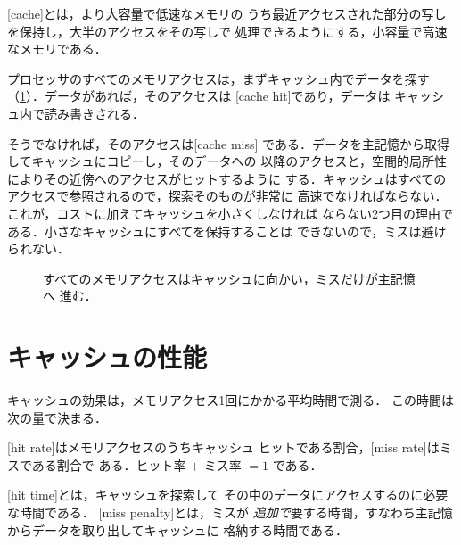 \documentclass[../main.tex]{subfiles}
\begin{document}
\begin{definition}[キャッシュ]
  [cache]とは，より大容量で低速なメモリの
  うち最近アクセスされた部分の写しを保持し，大半のアクセスをその写しで
  処理できるようにする，小容量で高速なメモリである．
\end{definition}

プロセッサのすべてのメモリアクセスは，まずキャッシュ内でデータを探す
（\cref{fig:l12-cache-position}）．データがあれば，そのアクセスは
[cache hit]であり，データは
キャッシュ内で読み書きされる．

そうでなければ，そのアクセスは[cache miss]%
である．データを主記憶から取得してキャッシュにコピーし，そのデータへの
以降のアクセスと，空間的局所性によりその近傍へのアクセスがヒットするように
する．キャッシュはすべてのアクセスで参照されるので，探索そのものが非常に
高速でなければならない．これが，コストに加えてキャッシュを小さくしなければ
ならない2つ目の理由である．小さなキャッシュにすべてを保持することは
できないので，ミスは避けられない．

\begin{figure}[htbp]
  \centering
  
  \caption{すべてのメモリアクセスはキャッシュに向かい，ミスだけが主記憶へ
    進む．}
  \label{fig:l12-cache-position}
\end{figure}

\section{キャッシュの性能}
\label{sec:l12-performance}

キャッシュの効果は，メモリアクセス1回にかかる平均時間で測る．
この時間は次の量で決まる．

\begin{definition}
  [hit rate]はメモリアクセスのうちキャッシュ
  ヒットである割合，[miss rate]はミスである割合で
  ある．ヒット率 $+$ ミス率 $= 1$ である．
\end{definition}

\begin{definition}
  [hit time]とは，キャッシュを探索して
  その中のデータにアクセスするのに必要な時間である．
  [miss penalty]とは，ミスが
  \emph{追加で}要する時間，すなわち主記憶からデータを取り出してキャッシュに
  格納する時間である．
\end{definition}
\end{document}
